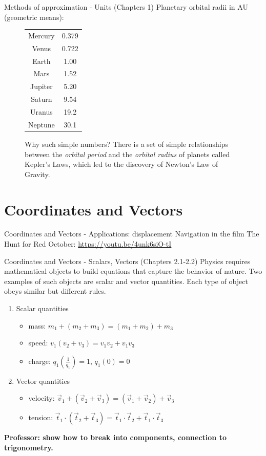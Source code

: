 \documentclass{beamer}
\begin{document}
\begin{frame}{Methods of approximation - Units (Chapters 1)}
Planetary orbital radii in \alert{AU} (geometric means):
\begin{figure}
\begin{tabular}{| c | c |}
\hline
Mercury & 0.379 \\
Venus & 0.722 \\
Earth & 1.00 \\
Mars & 1.52 \\
Jupiter & 5.20 \\
Saturn & 9.54 \\
Uranus & 19.2 \\
Neptune & 30.1 \\
\hline
\end{tabular}
\caption{\label{tab:planets} Why such simple numbers?  There is a set of simple relationships between the \textit{orbital period} and the \textit{orbital radius} of planets called Kepler's Laws, which led to the discovery of \alert{Newton's Law of Gravity.}}
\end{figure}
\end{frame}

\section{Coordinates and Vectors}

\begin{frame}{Coordinates and Vectors - Applications: displacement}
Navigation in the film The Hunt for Red October:
\url{https://youtu.be/4unk6siO-tI}
\end{frame}

\begin{frame}{Coordinates and Vectors - Scalars, Vectors (Chapters 2.1-2.2)}
Physics requires \alert{mathematical objects} to build equations that capture the behavior of nature.  Two examples of such objects are \alert{scalar} and \alert{vector} quantities.  Each type of object obeys similar but different rules.
\begin{enumerate}
\item Scalar quantities
\begin{itemize}
\item mass: $m_1+(m_2+m_3) = (m_1+m_2)+m_3$
\item speed: $v_1(v_2+v_3) = v_1v_2+v_1v_3$
\item charge: $q_1 \left(\frac{1}{q_1}\right) = 1$, $q_1(0) = 0$
\end{itemize}
\item Vector quantities
\begin{itemize}
\item velocity: $\vec{v}_1 + (\vec{v}_2+\vec{v}_3) = (\vec{v}_1 + \vec{v}_2)+\vec{v}_3$
\item tension: $\vec{t}_1 \cdot (\vec{t}_2 + \vec{t}_3) = \vec{t}_1 \cdot \vec{t}_2 + \vec{t}_1 \cdot \vec{t}_3$
\end{itemize}
\end{enumerate}
\textbf{Professor: show how to break into components, connection to trigonometry.}
\end{frame}
\end{document}
